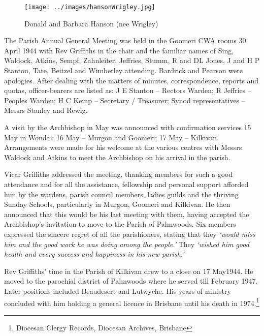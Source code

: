 \begin{figure}
\begin{center}
\texttt{[image: ../images/hansonWrigley.jpg]}
\caption{Donald and Barbara Hanson (nee Wrigley)}
\end{center}
\end{figure}




The Parish Annual General Meeting was held in the Goomeri CWA rooms 30 April 1944 with Rev Griffiths in the chair and the familiar names of Sing, Waldock, Atkins, Sempf, Zahnleiter, Jeffries, Stumm, R and DL Jones, J and H P Stanton, Tate, Beitzel and Wimberley attending. Bardrick and Pearson were apologies. After dealing with the matters of minutes, correspondence, reports and quotas, officer-bearers are listed as: J E Stanton -- Rectors Warden; R Jeffries -- Peoples Warden; H C Kemp -- Secretary / Treasurer; Synod representatives -- Messrs Stanley and Rewig.



A visit by the Archbishop in May was announced with confirmation services 15 May in Wondai; 16 May -- Murgon and Goomeri; 17 May -- Kilkivan. Arrangements were made for his welcome at the various centres with Messrs Waldock and Atkins to meet the Archbishop on his arrival in the parish.



Vicar Griffiths addressed the meeting, thanking members for such a good attendance and for all the assistance, fellowship and personal support afforded him by the wardens, parish council members, ladies guilds and the thriving Sunday Schools, particularly in Murgon, Goomeri and Kilkivan. He then announced that this would be his last meeting with them, having accepted the Archbishop's invitation to move to the Parish of Palmwoods. Six members expressed the sincere regret of all the parishioners, stating that they \emph{`would miss him and the good work he was doing among the people.'} They \emph{`wished him good health and every success and happiness in his new parish.'}



Rev Griffiths' time in the Parish of Kilkivan drew to a close on 17 May1944. He moved to the parochial district of Palmwoods where he served till February 1947. Later positions included Beaudesert and Lutwyche. His years of ministry concluded with him holding a general licence in Brisbane until his death in 1974.\footnote{Diocesan Clergy Records, Diocesan Archives, Brisbane}


\balance


